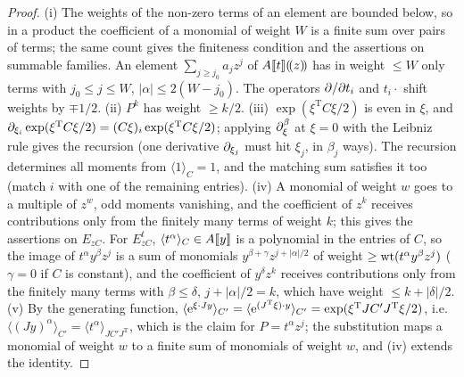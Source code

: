 \begin{proof}
(i) The weights of the non-zero terms of an element are bounded below, so in a product the coefficient of a monomial of weight $W$ is a finite sum over pairs of terms; the same count gives the finiteness condition and the assertions on summable families. An element $\sum_{j\geq j_0}a_jz^j$ of $A[\![ t ]\!](\!(z)\!)$ has in weight $\leq W$ only terms with $j_0\leq j\leq W$, $|\alpha|\leq2(W-j_0)$. The operators $\partial/\partial t_i$ and $t_i\cdot$ shift weights by $\mp1/2$. (ii) $P^k$ has weight $\geq k/2$. (iii) $\exp(\xi^{\mathrm T}C\xi/2)$ is even in $\xi$, and $\partial_{\xi_i}\exp(\xi^{\mathrm T}C\xi/2)=(C\xi)_i\exp(\xi^{\mathrm T}C\xi/2)$; applying $\partial_\xi^\beta$ at $\xi=0$ with the Leibniz rule gives the recursion (one derivative $\partial_{\xi_j}$ must hit $\xi_j$, in $\beta_j$ ways). The recursion determines all moments from $\langle1\rangle_C=1$, and the matching sum satisfies it too (match $i$ with one of the remaining entries). (iv) A monomial of weight $w$ goes to a multiple of $z^w$, odd moments vanishing, and the coefficient of $z^k$ receives contributions only from the finitely many terms of weight $k$; this gives the assertions on $E_{zC}$. For $E^t_{zC}$, $\langle t^\alpha\rangle_C\in A[\![ y ]\!]$ is a polynomial in the entries of $C$, so the image of $t^\alpha y^\beta z^j$ is a sum of monomials $y^{\beta+\gamma}z^{j+|\alpha|/2}$ of weight $\geq\operatorname{wt}(t^\alpha y^\beta z^j)$ ($\gamma=0$ if $C$ is constant), and the coefficient of $y^\delta z^k$ receives contributions only from the finitely many terms with $\beta\leq\delta$, $j+|\alpha|/2=k$, which have weight $\leq k+|\delta|/2$. (v) By the generating function, $\langle\mathrm{e}^{\xi\cdot Jy}\rangle_{C'}=\langle\mathrm{e}^{(J^{\mathrm T}\xi)\cdot y}\rangle_{C'}=\exp(\xi^{\mathrm T}JC'J^{\mathrm T}\xi/2)$, i.e.\ $\langle(Jy)^\alpha\rangle_{C'}=\langle t^\alpha\rangle_{JC'J^{\mathrm T}}$, which is the claim for $P=t^\alpha z^j$; the substitution maps a monomial of weight $w$ to a finite sum of monomials of weight $w$, and (iv) extends the identity.
\end{proof}


